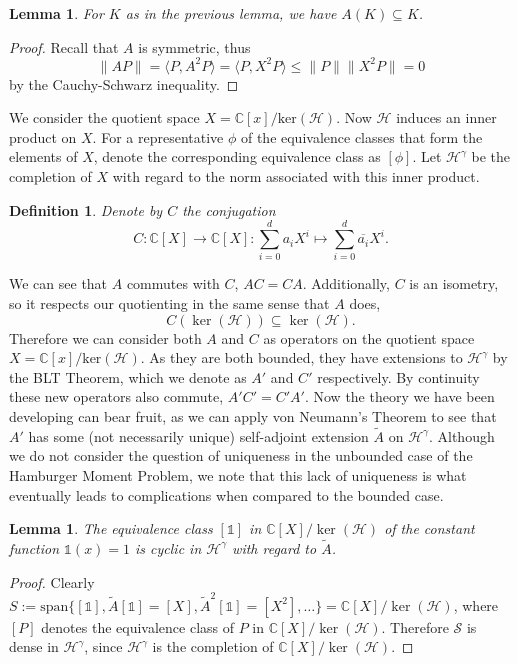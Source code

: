 \documentclass[12pt,oneside]{report}
\newtheorem{lem}[thm]{Lemma}
\newtheorem{defn}[thm]{Definition}
\begin{document}
\begin{lem}
    For $K$ as in the previous lemma, we have $A(K) \subseteq K$.
\end{lem}
\begin{proof}
    Recall that $A$ is symmetric, thus
    $$\|AP\| = \langle P, A^{2}P \rangle = \langle P, X^{2}P \rangle \leq \|P\|\|X^{2}P\| = 0$$
    by the Cauchy-Schwarz inequality.
\end{proof}

We consider the quotient space $X = \mathbb{C}[x]/\text{ker}(\mathcal{H})$. Now $\mathcal{H}$ induces an inner product on $X$. For a representative $\phi$ of the equivalence classes that form the elements of $X$, denote the corresponding equivalence class as $[\phi]$. Let $\mathscr{H}^{\gamma}$ be the completion of $X$ with regard to the norm associated with this inner product.

\begin{defn}
    Denote by $C$ the conjugation $$C: \mathbb{C}[X] \to \mathbb{C}[X]: \sum_{i=0}^{d}a_{i}X^{i} \mapsto \sum_{i=0}^{d}\overline{a_{i}}X^{i}.$$
\end{defn}

We can see that $A$ commutes with $C$, $AC = CA$. Additionally, $C$ is an isometry, so it respects our quotienting in the same sense that $A$ does,
$$C(\ker(\mathcal{H})) \subseteq \ker(\mathcal{H}).$$
Therefore we can consider both $A$ and $C$ as operators on the quotient space $X = \mathbb{C}[x]/\text{ker}(\mathcal{H})$. As they are both bounded, they have extensions to $\mathscr{H}^\gamma$ by the BLT Theorem, which we denote as $A'$ and $C'$ respectively. By continuity these new operators also commute, $A'C' = C'A'$. Now the theory we have been developing can bear fruit, as we can apply von Neumann's Theorem to see that $A'$ has some (not necessarily unique) self-adjoint extension $\tilde{A}$ on $\mathscr{H}^\gamma$. Although we do not consider the question of uniqueness in the unbounded case of the Hamburger Moment Problem, we note that this lack of uniqueness is what eventually leads to complications when compared to the bounded case.

\begin{lem}
    The equivalence class $[\mathds{1}]$ in $\mathbb{C}[X]/\ker(\mathcal{H})$ of the constant function $\mathds{1}(x) = 1$ is cyclic in $\mathscr{H}^{\gamma}$ with regard to $\tilde{A}$.
\end{lem}
\begin{proof}
    Clearly $S := \text{span}\{ [\mathds{1}], \tilde{A}[\mathds{1}] = [X], \tilde{A}^{2}[\mathds{1}] = [X^{2}], \dots \} = \mathbb{C}[X]/\ker(\mathcal{H})$, where $[P]$ denotes the equivalence class of $P$ in $\mathbb{C}[X]/\ker(\mathcal{H})$. Therefore $\mathcal{S}$ is dense in $\mathscr{H}^{\gamma}$, since $\mathscr{H}^{\gamma}$ is the completion of $\mathbb{C}[X]/\ker(\mathcal{H})$.
\end{proof}
\end{document}
